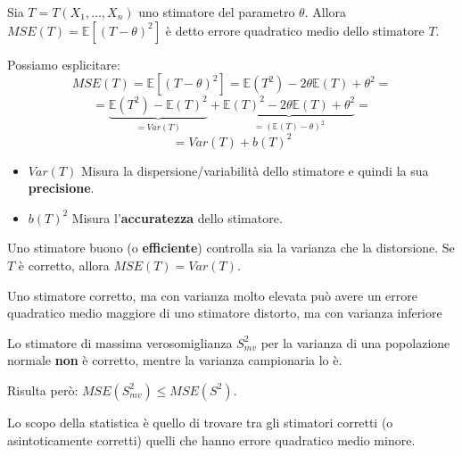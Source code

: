 \documentclass[a4paper]{article}
\theoremstyle{break}
\theoremstyle{break}
\theoremstyle{break}
\theoremstyle{break}
\begin{document}
\begin{definition}
  Sia \( T = T(X_1, \ldots, X_n) \) uno stimatore del parametro \( \theta \). Allora
  \( MSE(T) = \mathbb{E}[(T- \theta)^2] \) è detto errore quadratico medio dello
  stimatore \( T \).

  \vspace{1em}
  \noindent Possiamo esplicitare:
  \[
    MSE(T) = \mathbb{E}[(T-\theta)^2] = \mathbb{E}(T^2) - 2\theta \mathbb{E}(T) + \theta^2 =
  \] 
  \[
    = \underbrace{\mathbb{E}(T^2) - \mathbb{E}(T)^2}_{= Var(T)} + \underbrace{\mathbb{E}(T)^2 - 2 \theta \mathbb{E}(T) + \theta^2}_{= (\mathbb{E}(T)-\theta)^2} =
  \] 
  \[
    = Var(T) + b(T)^2
  \] 
  \begin{itemize}
    \item \( Var(T) \) Misura la dispersione/variabilità dello stimatore e quindi la sua
      \textbf{precisione}.
    \item \( b(T)^2 \) Misura l'\textbf{accuratezza} dello stimatore.
  \end{itemize}

  \noindent Uno stimatore buono (o \textbf{efficiente}) controlla sia la varianza che la distorsione.
  Se \( T \) è corretto, allora \( MSE(T) = Var(T) \).

  \vspace{1em}
  \noindent Uno stimatore corretto, ma con varianza molto elevata può avere un errore
  quadratico medio maggiore di uno stimatore distorto, ma con varianza inferiore
\end{definition}

\begin{example}
  Lo stimatore di massima verosomiglianza \( S^2_{mv} \) per la varianza di una popolazione
  normale \textbf{non} è corretto, mentre la varianza campionaria lo è.

  \vspace{1em}
  \noindent Risulta però: \( MSE(S^2_{mv}) \le MSE(S^2) \).
\end{example}

\noindent Lo scopo della statistica è quello di trovare tra gli stimatori corretti (o
asintoticamente corretti) quelli che hanno errore quadratico medio minore.
\end{document}
